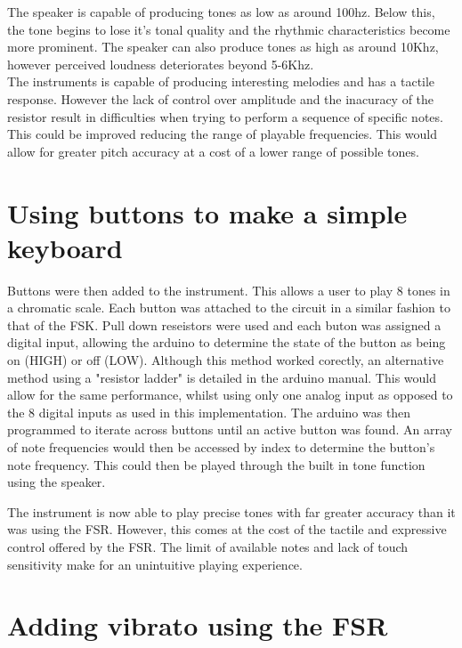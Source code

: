 \documentclass[titlepage]{scrartcl}
\begin{document}
    \begin{figure}[H]
    \end{figure}

    The speaker is capable of producing tones as low as around 100hz. Below
    this, the tone begins to lose it's tonal quality and the rhythmic
    characteristics become more prominent. The speaker can also produce tones
    as high as around 10Khz, however perceived loudness deteriorates beyond
    5-6Khz.\\
    The instruments is capable of producing interesting melodies and has a
    tactile response. However the lack of control over amplitude and the
    inacuracy of the resistor result in difficulties when trying to perform a
    sequence of specific notes. This could be improved reducing the range of
    playable frequencies. This would allow for greater pitch accuracy at a cost
    of a lower range of possible tones.

    \section{Using buttons to make a simple keyboard}
    Buttons were then added to the instrument. This allows a user to play 8
    tones in a chromatic scale. Each button was attached to the circuit in a
    similar fashion to that of the FSK. Pull down reseistors were used and each
    buton was assigned a digital input, allowing the arduino to determine the
    state of the button as being on (HIGH) or off (LOW). Although this method
    worked corectly, an alternative method using a "resistor ladder" is
    detailed in the arduino manual. This would allow for the same performance,
    whilst using only one analog input as opposed to the 8 digital inputs as
    used in this implementation.
    The arduino was then programmed to iterate across buttons until an active
    button was found. An array of note frequencies would then be accessed by
    index to determine the button's note frequency. This could then be played
    through the built in tone function using the speaker.\\

    \begin{figure}[H]
    \end{figure}

    The instrument is now able to play precise tones with far greater accuracy
    than it was using the FSR. However, this comes at the cost of the tactile
    and expressive control offered by the FSR. The limit of available notes and
    lack of touch sensitivity make for an unintuitive playing experience.
    \section{Adding vibrato using the FSR}


    \printbibliography
\end{document}
